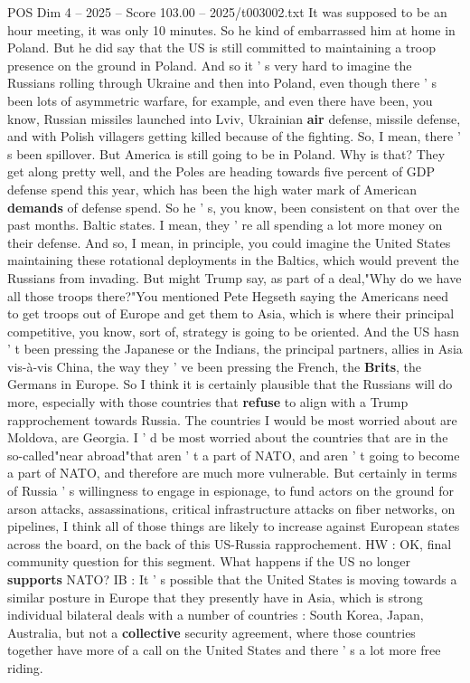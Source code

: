 \begin{textsample}{POS Dim 4 – 2025 – Score 103.00 – 2025/t003002.txt}
It was supposed to be an hour meeting, it was only 10 minutes.
So he kind of embarrassed him at home in Poland.
But he did say that the US is still committed to maintaining a troop presence on the ground in Poland.
And so it ' s very hard to imagine the Russians rolling through Ukraine and then into Poland, even though there ' s been lots of asymmetric warfare, for example, and even there have been, you know, Russian missiles launched into Lviv, Ukrainian \textbf{air} defense, missile defense, and with Polish villagers getting killed because of the fighting.
So, I mean, there ' s been spillover.
But America is still going to be in Poland.
Why is that?
They get along pretty well, and the Poles are heading towards five percent of GDP defense spend this year, which has been the high water mark of American \textbf{demands} of defense spend.
So he ' s, you know, been consistent on that over the past months.
Baltic states.
I mean, they ' re all spending a lot more money on their defense.
And so, I mean, in principle, you could imagine the United States maintaining these rotational deployments in the Baltics, which would prevent the Russians from invading.
But might Trump say, as part of a deal,"Why do we have all those troops there?"You mentioned Pete Hegseth saying the Americans need to get troops out of Europe and get them to Asia, which is where their principal competitive, you know, sort of, strategy is going to be oriented.
And the US hasn ' t been pressing the Japanese or the Indians, the principal partners, allies in Asia vis-à-vis China, the way they ' ve been pressing the French, the \textbf{Brits}, the Germans in Europe.
So I think it is certainly plausible that the Russians will do more, especially with those countries that \textbf{refuse} to align with a Trump rapprochement towards Russia.
The countries I would be most worried about are Moldova, are Georgia.
I ' d be most worried about the countries that are in the so-called"near abroad"that aren ' t a part of NATO, and aren ' t going to become a part of NATO, and therefore are much more vulnerable.
But certainly in terms of Russia ' s willingness to engage in espionage, to fund actors on the ground for arson attacks, assassinations, critical infrastructure attacks on fiber networks, on pipelines, I think all of those things are likely to increase against European states across the board, on the back of this US-Russia rapprochement.
HW : OK, final community question for this segment.
What happens if the US no longer \textbf{supports} NATO?
IB : It ' s possible that the United States is moving towards a similar posture in Europe that they presently have in Asia, which is strong individual bilateral deals with a number of countries : South Korea, Japan, Australia, but not a \textbf{collective} security agreement, where those countries together have more of a call on the United States and there ' s a lot more free riding.

\end{textsample}
